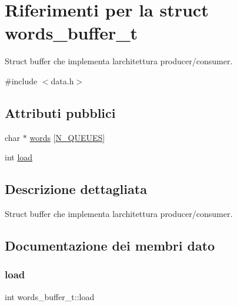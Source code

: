 \hypertarget{structwords__buffer__t}{}\section{Riferimenti per la struct words\+\_\+buffer\+\_\+t}
\label{structwords__buffer__t}


Struct buffer che implementa l\textquotesingle{}architettura producer/consumer.  




{\ttfamily \#include $<$data.\+h$>$}

\subsection*{Attributi pubblici}
\begin{DoxyCompactItemize}
\item 
char $\ast$ \hyperlink{structwords__buffer__t_adf3a889cf3336fbf3bae9104f65e2969}{words} \mbox{[}\hyperlink{data_8h_abbb1a97343fdbf54e75f14fb83cb0a92}{N\+\_\+\+Q\+U\+E\+U\+ES}\mbox{]}
\item 
int \hyperlink{structwords__buffer__t_a86636af515bf8ca7b564e2c46ff24e28}{load}
\end{DoxyCompactItemize}


\subsection{Descrizione dettagliata}
Struct buffer che implementa l\textquotesingle{}architettura producer/consumer. 

\subsection{Documentazione dei membri dato}
\mbox{\label{structwords__buffer__t_a86636af515bf8ca7b564e2c46ff24e28}} 
\subsubsection{\texorpdfstring{load}{load}}
{\footnotesize\ttfamily int words\+\_\+buffer\+\_\+t\+::load}

\mbox{\label{structwords__buffer__t_adf3a889cf3336fbf3bae9104f65e2969}} 
